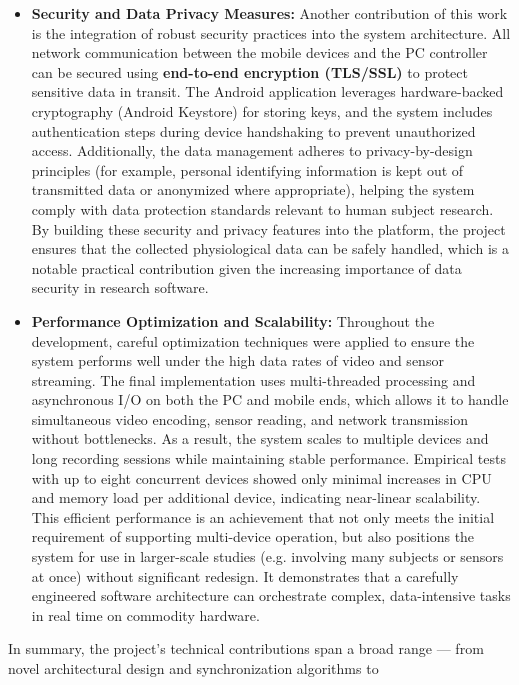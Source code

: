 \begin{itemize}
\item \textbf{Security and Data Privacy Measures:} Another contribution of this
  work is the integration of robust security practices into the system
  architecture. All network communication between the mobile devices and
  the PC controller can be secured using \textbf{end-to-end encryption
  (TLS/SSL)} to protect sensitive data in transit. The Android
  application leverages hardware-backed cryptography (Android Keystore)
  for storing keys, and the system includes authentication steps during
  device handshaking to prevent unauthorized access. Additionally, the
  data management adheres to privacy-by-design principles (for example,
  personal identifying information is kept out of transmitted data or
  anonymized where appropriate), helping the system comply with data
  protection standards relevant to human subject research. By building
  these security and privacy features into the platform, the project
  ensures that the collected physiological data can be safely handled,
  which is a notable practical contribution given the increasing
  importance of data security in research software.

\item \textbf{Performance Optimization and Scalability:} Throughout the
  development, careful optimization techniques were applied to ensure
  the system performs well under the high data rates of video and sensor
  streaming. The final implementation uses multi-threaded processing and
  asynchronous I/O on both the PC and mobile ends, which allows it to
  handle simultaneous video encoding, sensor reading, and network
  transmission without bottlenecks. As a result, the system scales to
  multiple devices and long recording sessions while maintaining stable
  performance. Empirical tests with up to eight concurrent devices
  showed only minimal increases in CPU and memory load per additional
  device, indicating near-linear scalability. This efficient performance
  is an achievement that not only meets the initial requirement of
  supporting multi-device operation, but also positions the system for
  use in larger-scale studies (e.g. involving many subjects or sensors
  at once) without significant redesign. It demonstrates that a
  carefully engineered software architecture can orchestrate complex,
  data-intensive tasks in real time on commodity hardware.

\end{itemize}
In summary, the project's technical contributions span a broad range ---
from novel architectural design and synchronization algorithms to
